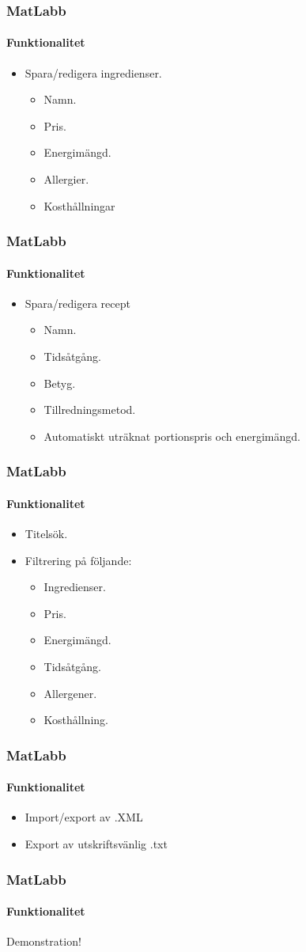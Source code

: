 \begin{frame}
  \frametitle{MatLabb}
  \framesubtitle{Funktionalitet}
  \begin{itemize}
  \item<1-> Spara/redigera ingredienser.
    \begin{itemize}
    \item<1-> Namn.
    \item<1-> Pris.
    \item<1-> Energimängd.
    \item<1-> Allergier.
    \item<1-> Kosthållningar
    \end{itemize}  
  \end{itemize}
\end{frame}

\begin{frame}
  \frametitle{MatLabb}
  \framesubtitle{Funktionalitet}
  \begin{itemize}
  \item<1-> Spara/redigera recept
    \begin{itemize}
    \item<1-> Namn.
    \item<1-> Tidsåtgång.
    \item<1-> Betyg.
    \item<1-> Tillredningsmetod.
    \item<1-> Automatiskt uträknat portionspris och energimängd.
    \end{itemize}
  \end{itemize}
\end{frame}

\begin{frame}
  \frametitle{MatLabb}
  \framesubtitle{Funktionalitet}
  \begin{itemize}
  \item<1-> Titelsök.
  \item<2-> Filtrering på följande:
    \begin{itemize}
    \item<2-> Ingredienser.
    \item<2-> Pris.
    \item<2-> Energimängd.
    \item<2-> Tidsåtgång.
    \item<2-> Allergener.
    \item<2-> Kosthållning.
    \end{itemize}
  \end{itemize}
\end{frame}

\begin{frame}
  \frametitle{MatLabb}
  \framesubtitle{Funktionalitet}
  \begin{itemize}
  \item<1-> Import/export av .XML
  \item<2-> Export av utskriftsvänlig  .txt
  \end{itemize}
\end{frame}

\begin{frame}[c]
  \frametitle{MatLabb}
  \framesubtitle{Funktionalitet}
  \centering
  \Huge{Demonstration!}
\end{frame}

